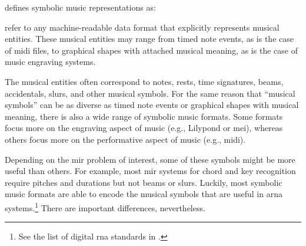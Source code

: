 

\textcite[1]{muller2015music} defines symbolic music
representations as:

\begin{italicsquote}
 refer to any machine-readable
data format that explicitly represents musical entities.
These musical entities may range from timed note events, as
is the case of \gls{midi} ﬁles, to graphical shapes with
attached musical meaning, as is the case of music engraving
systems.
\end{italicsquote}


The musical entities often correspond to notes, rests, time
signatures, beams, accidentals, slurs, and other musical
symbols. For the same reason that ``musical symbols'' can be
as diverse as timed note events or graphical shapes with
musical meaning, there is also a wide range of symbolic
music formats. Some formats focus more on the engraving
aspect of music (e.g., Lilypond or \gls{mei}), whereas
others focus more on the performative aspect of music (e.g.,
\gls{midi}).

Depending on the \gls{mir} problem of interest, some of
these symbols might be more useful than others. For example,
most \gls{mir} systems for chord and key recognition require
pitches and durations but not beams or slurs. Luckily, most
symbolic music formats are able to encode the musical
symbols that are useful in \gls{arna} systems.\footnote{See
the list of digital \gls{rna} standards in
.} There are
important differences, nevertheless.
